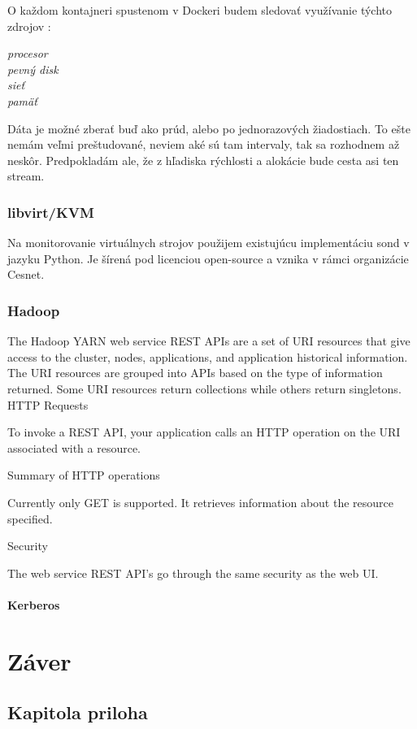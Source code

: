 \documentclass[11pt,final,oneside]{fithesis}
\begin{document}
O každom kontajneri spustenom v Dockeri budem sledovať využívanie týchto zdrojov :
\begin{description}
\item[\emph{procesor}]
\item[\emph{pevný disk}]
\item[\emph{sieť}]
\item[\emph{pamäť}]
\end{description}

  
Dáta je možné zberať buď ako prúd, alebo po jednorazových žiadostiach. To ešte nemám veľmi preštudované, neviem aké sú tam intervaly, tak sa rozhodnem až neskôr.
Predpokladám ale, že z hľadiska rýchlosti a alokácie bude cesta asi ten stream.

\subsection{libvirt/KVM}
Na monitorovanie virtuálnych strojov použijem existujúcu implementáciu sond v jazyku Python. Je šírená pod licenciou open-source a vznika v rámci organizácie Cesnet. 

\subsection{Hadoop}
The Hadoop YARN web service REST APIs are a set of URI resources that give access to the cluster, nodes, applications, and application historical information. 
The URI resources are grouped into APIs based on the type of information returned. Some URI resources return collections while others return singletons.
HTTP Requests

To invoke a REST API, your application calls an HTTP operation on the URI associated with a resource.

Summary of HTTP operations

Currently only GET is supported. It retrieves information about the resource specified.

Security

The web service REST API’s go through the same security as the web UI. 
\cite{18}

\subsubsection{Kerberos}




\chapter{Záver}


\nocite{*}



\begin{appendix}
\chapter{Kapitola priloha}
\end{appendix}
\end{document}
